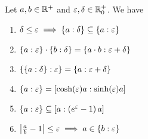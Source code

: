 \begin{theorem} \label{thm:multiplicative:rules}
  Let $a,b\in \Rplus$ and $\epsilon,\delta \in\Rplusnull$. We have

  \begin{enumerate}
    \item $\delta \le \epsilon \implies \ean[\delta]{a} \subseteq \ean[\epsilon]{a}$ 
    \item $\ean[\epsilon]{a} \cdot \ean[\delta]{b} = \ean[\epsilon+\delta]{a\cdot b}$
    \item $\ean[\epsilon]{\ean[\delta]{a}} = \ean[\epsilon+\delta]{a}$
    \item $\ean[\epsilon]{a} = \an[\sinh(\epsilon)a]{\cosh(\epsilon)a}$
    \item $\ean[\epsilon]{a} \subseteq \an[\left(e^\epsilon-1\right)a]{a}$
    \item $\abs{\frac ab-1} \le \epsilon \implies a\in\ean[\epsilon]{b}$
  \end{enumerate}
\end{theorem}

